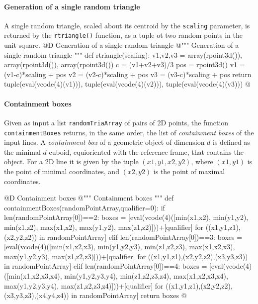\documentclass[11pt,oneside]{article}    %
\begin{document}
\paragraph{Generation of a single random triangle}
A single random triangle, scaled about its centroid by the \texttt{scaling} parameter, is returned by the \texttt{rtriangle()} function, as a tuple ot two random points in the unit square.
@D Generation of a single random triangle
@{""" Generation of a single random triangle """
def rtriangle(scaling):
    v1,v2,v3 = array(rpoint3d()), array(rpoint3d()), array(rpoint3d())
    c = (v1+v2+v3)/3
    pos = rpoint3d()
    v1 = (v1-c)*scaling + pos
    v2 = (v2-c)*scaling + pos
    v3 = (v3-c)*scaling + pos
    return tuple(eval(vcode(4)(v1))), tuple(eval(vcode(4)(v2))), tuple(eval(vcode(4)(v3)))
@}
    

\paragraph{Containment boxes}

Given as input a list \texttt{randomTriaArray} of pairs of 2D points, the function \texttt{containmentBoxes} returns, in the same order, the list of \emph{containment boxes} of the input lines. A \emph{containment box} of a geometric object of dimension $d$ is defined as the minimal $d$-cuboid, equioriented with the reference frame, that contains the object. For a 2D line it is given by the tuple $(x1,y1,x2,y2)$, where $(x1,y1)$ is the point of minimal coordinates, and $(x2,y2)$ is the point of maximal  coordinates.

@D Containment boxes
@{""" Containment boxes """
def containmentBoxes(randomPointArray,qualifier=0):
    if len(randomPointArray[0])==2:
        boxes = [eval(vcode(4)([min(x1,x2), min(y1,y2), min(z1,z2), 
                             max(x1,x2), max(y1,y2), max(z1,z2)]))+[qualifier]
                for ((x1,y1,z1),(x2,y2,z2)) in randomPointArray]
    elif len(randomPointArray[0])==3:
        boxes = [eval(vcode(4)([min(x1,x2,x3), min(y1,y2,y3), min(z1,z2,z3), 
                             max(x1,x2,x3), max(y1,y2,y3), max(z1,z2,z3)]))+[qualifier]
                for ((x1,y1,z1),(x2,y2,z2),(x3,y3,z3)) in randomPointArray]
    elif len(randomPointArray[0])==4:
        boxes = [eval(vcode(4)([min(x1,x2,x3,x4), min(y1,y2,y3,y4), min(z1,z2,z3,z4), 
                             max(x1,x2,x3,x4), max(y1,y2,y3,y4), max(z1,z2,z3,z4)]))+[qualifier]
                for ((x1,y1,z1),(x2,y2,z2),(x3,y3,z3),(x4,y4,z4)) in randomPointArray]
    return boxes
@}
\end{document}

